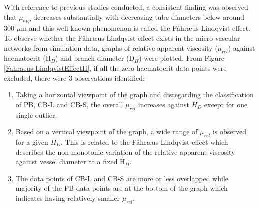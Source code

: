 \noindent With reference to previous studies\cite{Fahrus1931THETUBES, Pries1992BloodHematocrit, SECOMB2013470} conducted, a consistent finding was observed that $\mu_{app}$ decreases substantially with decreasing tube diameters below around 300 $\mu$m and this well-known phenomenon is called the F{\aa}hr{\ae}us-Lindqvist effect. To observe whether the F{\aa}hr{\ae}us-Lindqvist effect exists in the micro-vascular networks from simulation data, graphs of relative apparent viscosity ($\mu_{rel}$) against haematocrit (H$_{D}$) and branch diameter (D$_{H}$) were plotted. From Figure \ref{Fahraeus-LindqvistEffectH}, if all the zero-haematocrit data points were excluded, there were 3 observations identified:

\begin{enumerate}
    \item Taking a horizontal viewpoint of the graph and disregarding the classification of PB, CB-L and CB-S, the overall $\mu_{rel}$ increases against $H_{D}$ except for one single outlier. 
    \item Based on a vertical viewpoint of the graph, a wide range of $\mu_{rel}$ is observed for a given $H_{D}$. This is related to the F{\aa}hr{\ae}us-Lindqvist effect which describes the non-monotonic variation of the relative apparent viscosity against vessel diameter at a fixed H$_{D}$.
    \item The data points of CB-L and CB-S are more or less overlapped while majority of the PB data points are at the bottom of the graph which indicates having relatively smaller $\mu_{rel}$. 
\end{enumerate}

